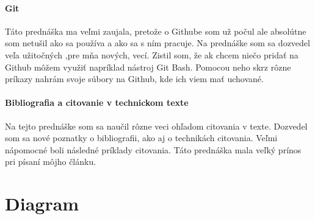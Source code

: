 \documentclass[10pt,twoside,slovak,a4paper]{article}
\begin{document}
\paragraph{Git}
Táto prednáška ma veľmi zaujala, pretože o Githube som už počul ale absolútne som netušil ako sa používa a ako sa s ním pracuje. Na prednáške som sa dozvedel veľa užitočných ,pre mňa nových, vecí. Zistil som, že ak chcem niečo pridať na Github môžem využiť napríklad nástroj Git Bash. Pomocou neho skrz rôzne príkazy nahrám svoje súbory na Github, kde ich viem mať uchované.
\paragraph{Bibliografia a citovanie v technickom texte}
Na tejto prednáške som sa naučil rôzne veci ohľadom citovania v texte. Dozvedel som sa nové poznatky o bibliografii, ako aj o technikách citovania. Veľmi nápomocné boli následné príklady citovania. Táto prednáška mala veľký prínos pri písaní môjho článku.

\section{Diagram}


 
\end{document}
